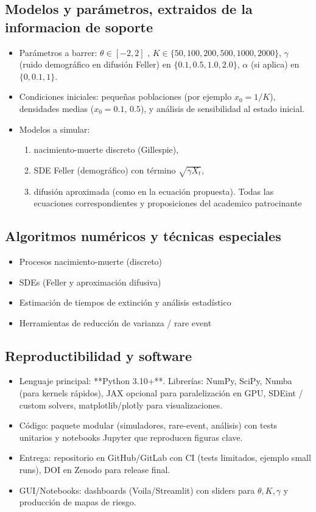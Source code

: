 \documentclass[12pt,]{article}
\begin{document}
\subsection{Modelos y parámetros, extraidos de la informacion de soporte}
\begin{itemize}
    \item Parámetros a barrer: $\theta\in[-2,2]$ , $K\in\{50,100,200,500,1000,2000\}$, $\gamma$ (ruido demográfico en difusión Feller) en $\{0.1,0.5,1.0,2.0\}$, $\alpha$ (si aplica) en $\{0,0.1,1\}$.
    \item Condiciones iniciales: pequeñas poblaciones (por ejemplo $x_0=1/K$), densidades medias ($x_0=0.1,\,0.5$), y análisis de sensibilidad al estado inicial.
    \item Modelos a simular: 
    \begin{enumerate}
        \item nacimiento-muerte discreto (Gillespie), 
	\item SDE Feller (demográfico) con término $\sqrt{\gamma X_t}$, 
	\item difusión aproximada (como en la ecuación propuesta). Todas las ecuaciones correspondientes y proposiciones del academico patrocinante
    \end{enumerate}
\end{itemize}

\subsection{Algoritmos numéricos y técnicas especiales}
\begin{itemize}
    \item Procesos nacimiento-muerte (discreto)
    \item SDEs (Feller y aproximación difusiva)
    \item Estimación de tiempos de extinción y análisis estadístico
    \item  Herramientas de reducción de varianza / rare event
\end{itemize}

\subsection{Reproductibilidad y software}
\begin{itemize}
    \item Lenguaje principal: **Python 3.10+**. Librerías: NumPy, SciPy, Numba (para kernels rápidos), JAX opcional para paralelización en GPU, SDEint / custom solvers, matplotlib/plotly para visualizaciones.
    \item Código: paquete modular (simuladores, rare-event, análisis) con tests unitarios y notebooks Jupyter que reproducen figuras clave.
    \item Entrega: repositorio en GitHub/GitLab con CI (tests limitados, ejemplo small runs), DOI en Zenodo para release final.
    \item GUI/Notebooks: dashboards (Voila/Streamlit) con sliders para $\theta, K, \gamma$ y producción de mapas de riesgo.
\end{itemize}
    
\end{document}
